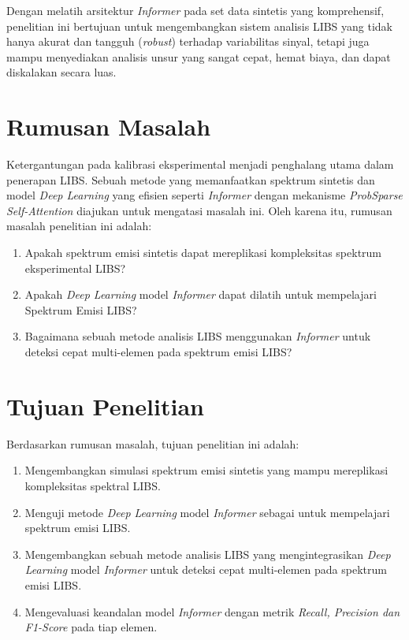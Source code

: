 Dengan melatih arsitektur \textit{Informer} pada set data sintetis yang komprehensif, penelitian ini bertujuan untuk mengembangkan sistem analisis LIBS yang tidak hanya akurat dan tangguh (\textit{robust}) terhadap variabilitas sinyal, tetapi juga mampu menyediakan analisis unsur yang sangat cepat, hemat biaya, dan dapat diskalakan secara luas.



\section{Rumusan Masalah}
\par Ketergantungan pada kalibrasi eksperimental menjadi penghalang utama dalam penerapan LIBS. Sebuah metode yang memanfaatkan spektrum sintetis dan model \textit{Deep Learning} yang efisien seperti \textit{Informer} dengan mekanisme \textit{ProbSparse Self-Attention} diajukan untuk mengatasi masalah ini. Oleh karena itu, rumusan masalah penelitian ini adalah:
\begin{enumerate}
    \item Apakah spektrum emisi sintetis dapat mereplikasi kompleksitas spektrum eksperimental LIBS?
    \item Apakah \textit{Deep Learning} model \textit{Informer} dapat dilatih untuk mempelajari Spektrum Emisi LIBS?
    \item Bagaimana sebuah metode analisis LIBS menggunakan \textit{Informer} untuk deteksi cepat multi-elemen  pada spektrum emisi LIBS?
\end{enumerate}

\section{Tujuan Penelitian}
Berdasarkan rumusan masalah, tujuan penelitian ini adalah:
\begin{enumerate}
    \item Mengembangkan  simulasi spektrum emisi sintetis yang mampu mereplikasi kompleksitas spektral LIBS.
    \item Menguji metode \textit{Deep Learning} model \textit{Informer} sebagai untuk mempelajari spektrum emisi LIBS.
    \item Mengembangkan sebuah metode analisis LIBS yang mengintegrasikan \textit{Deep Learning} model \textit{Informer} untuk deteksi cepat multi-elemen pada spektrum emisi LIBS.
    \item Mengevaluasi keandalan model \textit{Informer} dengan metrik \textit{Recall, Precision dan F1-Score} pada tiap elemen.
\end{enumerate}

